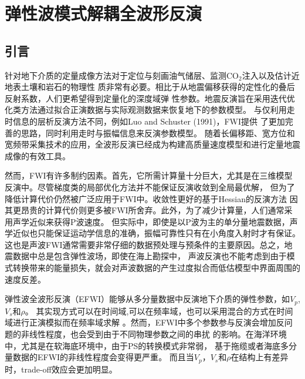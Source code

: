 



\chapter{弹性波模式解耦全波形反演}
\label{cha:MD-EFWI}
\section{引言}
针对地下介质的定量成像方法对于定位与刻画油气储层、监测CO$_2$注入以及估计近地表土壤和岩石的物理性
质非常有必要。相比于从地震偏移获得的定性化的叠后反射系数，人们更希望得到定量化的深度域弹
性参数。地震反演旨在采用迭代优化类方法通过拟合正演数据与实际观测数据来恢复地下的参数模型。
与仅利用走时信息的层析反演方法不同，例如Luo and Schuster (1991)\citep{luo1991}，FWI提供
了更加完善的思路，同时利用走时与振幅信息来反演参数模型\cite[]{tarantola:1986}。
随着长偏移距、宽方位和宽频带采集技术的应用，全波形反演已经成为构建高质量速度模型和进行定量地震成像的有效工具\cite{virieux2009overview}。

然而，FWI有许多制约因素。首先，它所需计算量十分巨大，尤其是在三维模型反演中。尽管梯度类的局部优化方法并不能保证反演收敛到全局最优解，
但为了降低计算代价仍然被广泛应用于FWI中。收敛性更好的基于Hessian的反演方法\cite{mora:1987,crase1990robust}
因其更昂贵的计算代价则更多被FWI所舍弃。此外，为了减少计算量，人们通常采用声学近似来获得P波速度\cite{ravaut2004multiscale,operto2006crustal}。
但实际中，即使是以P波为主的单分量地震数据，声学近似也只能保证运动学信息的准确，振幅可靠性只有在小角度入射时才有保证。
这也是声波FWI通常需要非常仔细的数据预处理与预条件的主要原因。总之，地震数据中总是包含弹性波场，即使在海上勘探中，
声波反演也不能考虑到由于模式转换带来的能量损失，就会对声波数据的产生过度拟合而低估模型中界面周围的速度反差。

弹性波全波形反演（EFWI）能够从多分量数据中反演地下介质的弹性参数，如$V_p$, $V_s$和$\rho$。
其实现方式可以在时间域\cite{shipp:2002},可以在频率域\cite{brossier2009}，也可以采用混合的方式在时间域进行正演模拟而在频率域求解
\cite{nihei.li:2007,sirgue:2008}。然而，EFWI中多个参数参与反演会增加反问题的非线性程度，也会受到由于不同物理参数之间的串扰
的影响\cite{forgues.lambare:1997}。在海洋环境中，尤其是在软海底环境中，由于PS的转换模式非常弱，
基于拖缆或者海底多分量数据的EFWI的非线性程度会变得更严重\cite{sears2008}。
而且当$V_p$，$V_s$和$\rho$在结构上有差异时，trade-off效应会更加明显。


